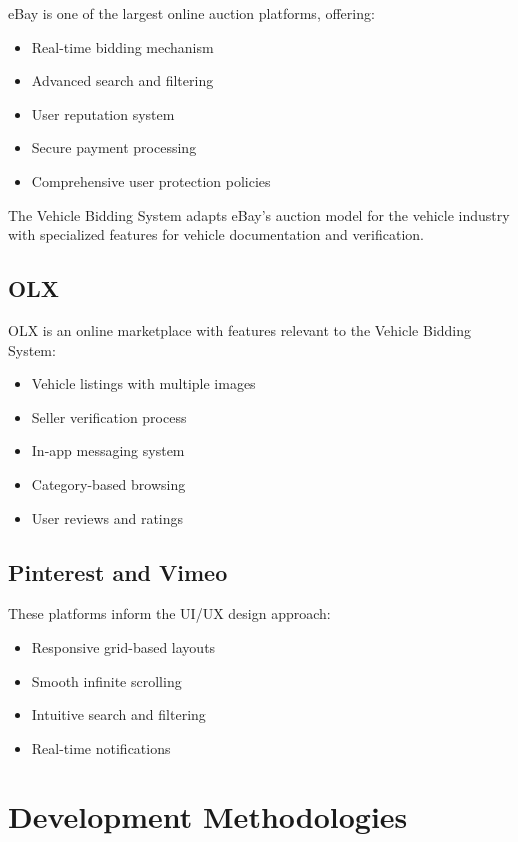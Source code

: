 eBay is one of the largest online auction platforms, offering:

\begin{itemize}
    \item Real-time bidding mechanism
    \item Advanced search and filtering
    \item User reputation system
    \item Secure payment processing
    \item Comprehensive user protection policies
\end{itemize}

The Vehicle Bidding System adapts eBay's auction model for the vehicle industry with specialized features for vehicle documentation and verification.

\subsection{OLX}

OLX is an online marketplace with features relevant to the Vehicle Bidding System:

\begin{itemize}
    \item Vehicle listings with multiple images
    \item Seller verification process
    \item In-app messaging system
    \item Category-based browsing
    \item User reviews and ratings
\end{itemize}

\subsection{Pinterest and Vimeo}

These platforms inform the UI/UX design approach:

\begin{itemize}
    \item Responsive grid-based layouts
    \item Smooth infinite scrolling
    \item Intuitive search and filtering
    \item Real-time notifications
\end{itemize}

\section{Development Methodologies}


